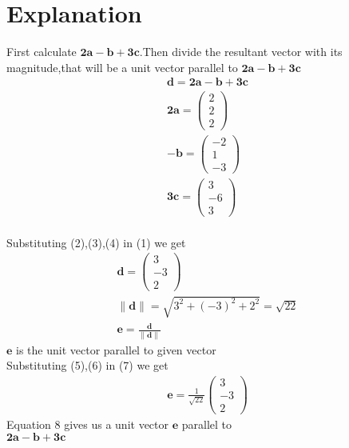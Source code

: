 \documentclass[journal,12pt,twocolumn]{IEEEtran}
\newcommand{\norm}[1]{\| #1 \|}
\begin{document}
\section{Explanation}
First calculate $\bm{2a}-\bm{b}+\bm{3c}$.Then divide the resultant vector with its magnitude,that will be a unit vector parallel to $\bm{2a}-\bm{b}+\bm{3c}$\\
\vspace{2mm}
\begin{align}
    \bm{d}=\bm{2a}-\bm{b}+\bm{3c}\\
    \bm{2a}=\begin{pmatrix}2\\2\\2\end{pmatrix}\\
    \bm{-b}=\begin{pmatrix}-2\\1\\-3\end{pmatrix}\\
    \bm{3c}=\begin{pmatrix}3\\-6\\3\end{pmatrix}
\end{align}
\vspace{2mm}\\
Substituting (2),(3),(4) in (1) we get\\
\begin{align}
    \bm{d}=\begin{pmatrix}3\\-3\\2\end{pmatrix}\\
    \norm{\bm{d}}=\sqrt{3^2+(-3)^2+2^2}=\sqrt{22}\\
    \bm{e}=\frac{\bm{d}}{\norm{\bm{d}}}
\end{align}
$\bm{e}$  is the unit vector parallel to given vector\\
Substituting (5),(6) in (7) we get
\begin{align}
    \boxed{\bm{e}=\frac{1}{\sqrt{22}}\begin{pmatrix}3\\-3\\2\end{pmatrix}}
\end{align}
Equation 8 gives us a unit vector $\bm{e}$ parallel to\\ $\bm{2a}-\bm{b}+\bm{3c}$  
\end{document}
